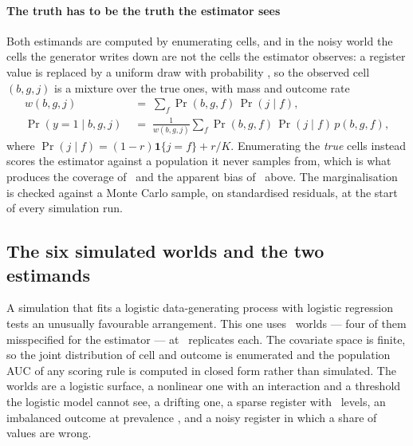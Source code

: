 

\paragraph{The truth has to be the truth the estimator sees}
Both estimands are computed by enumerating cells, and in the noisy world the
cells the generator writes down are not the cells the estimator observes: a
register value is replaced by a uniform draw with probability
\simNoiseRate, so the observed cell $(b, g, j)$ is a mixture over the true
ones, with mass and outcome rate
\[
\begin{aligned}
w(b,g,j) \;&=\; \sum_{f} \Pr(b,g,f)\,\Pr(j \mid f), \\[2pt]
\Pr(y{=}1 \mid b,g,j) \;&=\; \frac{1}{w(b,g,j)}
\sum_{f} \Pr(b,g,f)\,\Pr(j \mid f)\,p(b,g,f),
\end{aligned}
\]
where $\Pr(j \mid f) = (1 - r)\mathbf{1}\{j = f\} + r/K$. Enumerating the
\emph{true} cells instead scores the estimator against a population it never
samples from, which is what produces the coverage of \coverageNoisyBefore\
and the apparent bias of \biasNoisyBefore\ above. The marginalisation is
checked against a Monte Carlo sample, on standardised residuals, at the start
of every simulation run.

\subsection{The six simulated worlds and the two estimands}
\label{app:worlds}


A simulation that fits a logistic data-generating process with logistic
regression tests an unusually favourable arrangement. This one uses \nWorlds\
worlds --- four of them misspecified for the estimator --- at \nSimReps\
replicates each. The covariate space is finite, so the joint distribution of
cell and outcome is enumerated and the population AUC of any scoring rule is
computed in closed form rather than simulated. The worlds are a logistic
surface, a nonlinear one with an interaction and a threshold the logistic
model cannot see, a drifting one, a sparse register with \nSimSparse\ levels,
an imbalanced outcome at prevalence \simPrevalence, and a noisy register in
which a share of values are wrong.


